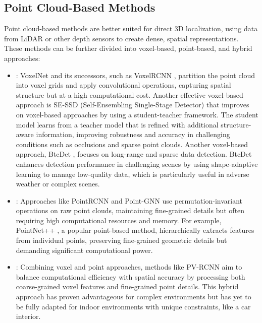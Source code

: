 \subsection{Point Cloud-Based Methods}
Point cloud-based methods are better suited for direct 3D localization, 
using data from LiDAR or other depth sensors to create dense, spatial 
representations. These methods can be further divided into voxel-based, 
point-based, and hybrid approaches:
\begin{itemize}
    \item {}: VoxelNet \cite{voxnet} 
    and its successors, such as VoxelRCNN \cite{voxelrcnn}, 
    partition the point cloud into voxel grids and apply convolutional 
    operations, capturing spatial structure but at a high computational 
    cost. Another effective voxel-based approach is 
    SE-SSD (Self-Ensembling Single-Stage Detector) \cite{se_ssd} 
    that improves on voxel-based approaches by using a student-teacher 
    framework. The student model learns from a teacher model that is 
    refined with additional structure-aware information, improving 
    robustness and accuracy in challenging conditions such as occlusions 
    and sparse point clouds. Another voxel-based approach, 
    BtcDet \cite{bdc_det}, focuses on long-range and sparse 
    data detection. BtcDet enhances detection performance in challenging 
    scenes by using shape-adaptive learning to manage low-quality data, 
    which is particularly useful in adverse weather or complex scenes.
    \item {}: Approaches like 
    PointRCNN \cite{point_rcnn} and 
    Point-GNN \cite{point_gnn} use permutation-invariant 
    operations on raw point clouds, maintaining fine-grained details 
    but often requiring high computational resources and memory. 
    For example, PointNet++ \cite{pointnet++} , 
    a popular point-based method, hierarchically extracts features 
    from individual points, preserving fine-grained geometric details 
    but demanding significant computational power.
    \item {}: Combining voxel and point approaches, 
    methods like PV-RCNN \cite{pv_rcnn} aim to balance 
    computational efficiency with spatial accuracy by processing both 
    coarse-grained voxel features and fine-grained point details. 
    This hybrid approach has proven advantageous for complex environments but 
    has yet to be fully adapted for indoor environments with unique constraints, 
    like a car interior.
\end{itemize}


